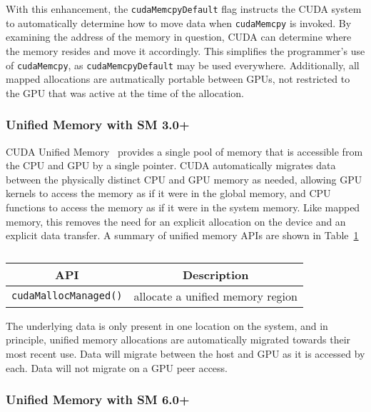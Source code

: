 With this enhancement, the \texttt{cudaMemcpyDefault} flag instructs the CUDA system to automatically determine how to move data when \texttt{cudaMemcpy} is invoked.
By examining the address of the memory in question, CUDA can determine where the memory resides and move it accordingly.
This simplifies the programmer's use of \texttt{cudaMemcpy}, as \texttt{cudaMemcpyDefault} may be used everywhere.
Additionally, all mapped allocations are autmatically portable between GPUs, not restricted to the GPU that was active at the time of the allocation.

\subsubsection{Unified Memory with SM 3.0+}

CUDA Unified Memory~\cite{harris2013cudaunifiedmemory} provides a single pool of memory that is accessible from the CPU and GPU by a single pointer.
CUDA automatically migrates data between the physically distinct CPU and GPU memory as needed, allowing GPU kernels to access the memory as if it were in the global memory, and CPU functions to access the memory as if it were in the system memory.
Like mapped memory, this removes the need for an explicit allocation on the device and an explicit data transfer.
A summary of unified memory APIs are shown in Table~\ref{tab:cuda-um-apis}

\begin{table}[h]
    \centering
    \caption[CUDA Unified Memory-Management APIs]{}
    \label{tab:cuda-um-apis}
    \begin{tabular}{|c|c|}
    \hline
    \textbf{API}                & \textbf{Description} \\ \hline
    \texttt{cudaMallocManaged()}   & allocate a unified memory region \\ \hline
    \end{tabular}
\end{table}

The underlying data is only present in one location on the system, and in principle, unified memory allocations are automatically migrated towards their most recent use.
Data will migrate between the host and GPU as it is accessed by each.
Data will not migrate on a GPU peer access.

\subsubsection{Unified Memory with SM 6.0+}

